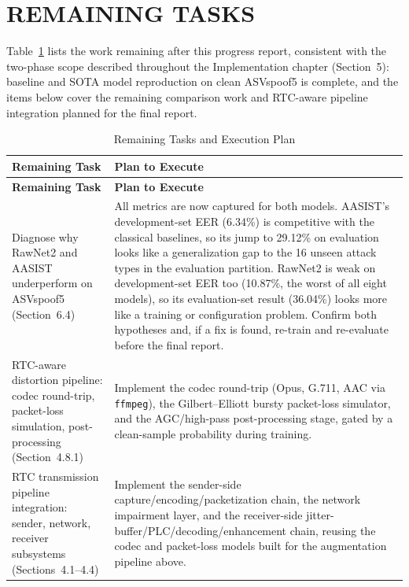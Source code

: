 \newpage
\section{REMAINING TASKS}

Table~\ref{tab:impl_status} lists the work remaining after this progress report, consistent with the two-phase scope described throughout the Implementation chapter (Section~5): baseline and SOTA model reproduction on clean ASVspoof5 is complete, and the items below cover the remaining comparison work and RTC-aware pipeline integration planned for the final report.

\renewcommand{\arraystretch}{1.5}
\setlength{\tabcolsep}{8pt}
\begin{longtable}{>{\raggedright\arraybackslash}p{4.2cm} >{\raggedright\arraybackslash}p{8.5cm}}
\caption{Remaining Tasks and Execution Plan} \label{tab:impl_status} \\
\hline
\textbf{Remaining Task} & \textbf{Plan to Execute} \\
\hline
\endfirsthead
\hline
\textbf{Remaining Task} & \textbf{Plan to Execute} \\
\hline
\endhead
\hline
\endfoot
Diagnose why RawNet2 and AASIST underperform on ASVspoof5 (Section~6.4) &
All metrics are now captured for both models. AASIST's development-set EER (6.34\%) is competitive with the classical baselines, so its jump to 29.12\% on evaluation looks like a generalization gap to the 16 unseen attack types in the evaluation partition. RawNet2 is weak on development-set EER too (10.87\%, the worst of all eight models), so its evaluation-set result (36.04\%) looks more like a training or configuration problem. Confirm both hypotheses and, if a fix is found, re-train and re-evaluate before the final report. \\
RTC-aware distortion pipeline: codec round-trip, packet-loss simulation, post-processing (Section~4.8.1) &
Implement the codec round-trip (Opus, G.711, AAC via \texttt{ffmpeg}), the Gilbert--Elliott bursty packet-loss simulator, and the AGC/high-pass post-processing stage, gated by a clean-sample probability during training. \\
RTC transmission pipeline integration: sender, network, receiver subsystems (Sections~4.1--4.4) &
Implement the sender-side capture/encoding/packetization chain, the network impairment layer, and the receiver-side jitter-buffer/PLC/decoding/enhancement chain, reusing the codec and packet-loss models built for the augmentation pipeline above. \\

\end{longtable}
